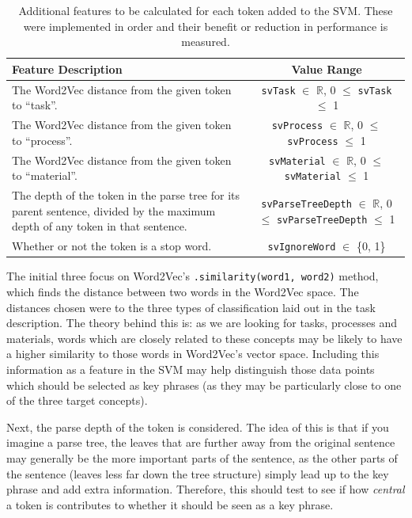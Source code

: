 \begin{table}
	\centering
	\begin{tabular}{ C{7cm} | c }
		\textbf{Feature Description} & \textbf{Value Range} \\
		\hline
		The Word2Vec distance from the given token to ``task''. & \texttt{svTask} $\in$ $\mathbb{R}$,  0 $\leq$ \texttt{svTask} $\leq$ 1 \\
		\hline
		The Word2Vec distance from the given token to ``process''. & \texttt{svProcess} $\in$ $\mathbb{R}$,  0 $\leq$ \texttt{svProcess} $\leq$ 1 \\
		\hline
		The Word2Vec distance from the given token to ``material''. & \texttt{svMaterial} $\in$ $\mathbb{R}$,  0 $\leq$ \texttt{svMaterial} $\leq$ 1 \\
		\hline
		The depth of the token in the parse tree for its parent sentence, divided by the maximum depth of any token in that sentence. & \texttt{svParseTreeDepth} $\in$ $\mathbb{R}$,  0 $\leq$ \texttt{svParseTreeDepth} $\leq$ 1 \\
		\hline
		Whether or not the token is a stop word. & \texttt{svIgnoreWord} $\in$ \{0, 1\} \\
	\end{tabular}
	\caption[Additional Key Phrase SVM Features]{Additional features to be calculated for each token added to the SVM. These were implemented in order and their benefit or reduction in performance is measured.}
	\label{table:kpextsvs}
\end{table}

The initial three focus on Word2Vec's \texttt{.similarity(word1, word2)} method, which finds the distance between two words in the Word2Vec space. The distances chosen were to the three types of classification laid out in the task description. The theory behind this is: as we are looking for tasks, processes and materials, words which are closely related to these concepts may be likely to have a higher similarity to those words in Word2Vec's vector space. Including this information as a feature in the SVM may help distinguish those data points which should be selected as key phrases (as they may be particularly close to one of the three target concepts).

Next, the parse depth of the token is considered. The idea of this is that if you imagine a parse tree, the leaves that are further away from the original sentence may generally be the more important parts of the sentence, as the other parts of the sentence (leaves less far down the tree structure) simply lead up to the key phrase and add extra information. Therefore, this should test to see if how \textit{central} a token is contributes to whether it should be seen as a key phrase.

